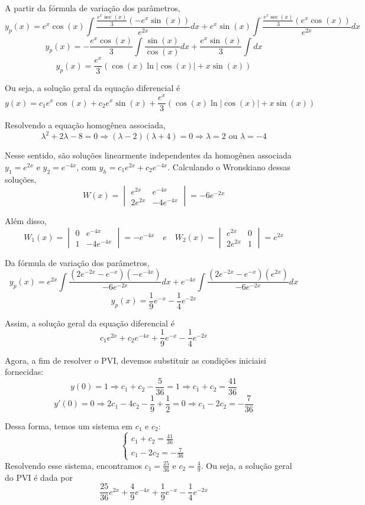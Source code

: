 \documentclass[oneside,12pt,a4paper]{report}
\begin{document}
\begin{resolucao}
    A partir da fórmula de variação dos parâmetros,
    \[y_p(x)=e^x\cos(x)\int\frac{\frac{e^x\sec(x)}{3}(-e^x\sin(x))}{e^{2x}}dx+e^x\sin(x)\int\frac{\frac{e^x\sec(x)}{3}(e^x\cos(x))}{e^{2x}}dx\]
    \[y_p(x)=-\frac{e^x\cos(x)}{3}\int\frac{\sin(x)}{\cos(x)}dx+\frac{e^x\sin(x)}{3}\int dx\]
    \[y_p(x)=\frac{e^x}{3}(\cos(x)\ln|\cos(x)|+x\sin(x))\]

    Ou seja, a solução geral da equação diferencial é
    \[\boxed{y(x)=c_1e^x\cos(x)+c_2e^x\sin(x)+\frac{e^x}{3}(\cos(x)\ln|\cos(x)|+x\sin(x))}\]

    \itemresolucao Resolvendo a equação homogênea associada,
    \[\lambda^2+2\lambda-8=0\Rightarrow(\lambda-2)(\lambda+4)=0\Rightarrow\lambda=2\text{ ou }\lambda=-4\]

    Nesse sentido, são soluções linearmente independentes da homogênea associada $y_1=e^{2x}$ e $y_2=e^{-4x}$, com $y_h=c_1e^{2x}+c_2e^{-4x}$. Calculando o Wronskiano dessas soluções,
    \[W(x)=\begin{vmatrix}
        e^{2x} & e^{-4x}\\
        2e^{2x} & -4e^{-4x}
    \end{vmatrix}=-6e^{-2x}\]

    Além disso,
    \[W_1(x)=\begin{vmatrix}
        0 & e^{-4x}\\
        1 & -4e^{-4x}
    \end{vmatrix}=-e^{-4x}\quad e \quad W_2(x)=\begin{vmatrix}
        e^{2x}  & 0\\
        2e^{2x} & 1
    \end{vmatrix}=e^{2x}\]

    Da fórmula de variação dos parâmetros,
    \[y_p(x)=e^{2x}\int\frac{(2e^{-2x}-e^{-x})(-e^{-4x})}{-6e^{-2x}}dx+e^{-4x}\int\frac{(2e^{-2x}-e^{-x})(e^{2x})}{-6e^{-2x}}dx\]
    \[y_p(x)=\frac{1}{9}e^{-x}-\frac{1}{4}e^{-2x}\]

    Assim, a solução geral da equação diferencial é
    \[\boxed{c_1e^{2x}+c_2e^{-4x}+\frac{1}{9}e^{-x}-\frac{1}{4}e^{-2x}}\]

    Agora, a fim de resolver o PVI, devemos substituir as condições iniciaisi fornecidas:
    \[y(0)=1\Rightarrow c_1+c_2-\frac{5}{36}=1\Rightarrow c_1+c_2=\frac{41}{36}\]
    \[y'(0)=0\Rightarrow 2c_1-4c_2-\frac{1}{9}+\frac{1}{2}=0\Rightarrow c_1-2c_2=-\frac{7}{36}\]

    Dessa forma, temos um sistema em $c_1$ e $c_2$:
    \[\begin{cases}
        c_1+c_2=\frac{41}{36}\\
        c_1-2c_2=-\frac{7}{36}
    \end{cases}\]
    Resolvendo esse sistema, encontramos $c_1=\frac{25}{36}$ e $c_2=\frac{4}{9}$. Ou seja, a solução geral do PVI é dada por
    \[\boxed{\frac{25}{36}e^{2x}+\frac{4}{9}e^{-4x}+\frac{1}{9}e^{-x}-\frac{1}{4}e^{-2x}}\]

\end{resolucao}
\end{document}
